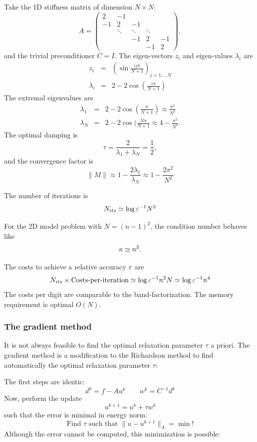 Take the 1D stiffness matrix of dimension $N \times N$:
$$
A = \left( \begin{array}{ccccc}
        2 & -1  \\
        -1 & 2 & -1 \\
        & \ddots & \ddots & \ddots \\
        & & -1 & 2 & -1 \\
        & & & -1 & 2 
        \end{array}
        \right),
$$
and the trivial preconditioner $C = I$. The eigen-vectors $z_i$ and 
eigen-values $\lambda_i$ are
\begin{eqnarray*}
z_{i} & = & \left(\sin \frac{i j \pi}{N+1} \right)_{j=1, \ldots N} \\
\lambda_i & = & 2 - 2 \cos (\frac{i \pi}{N+1})
\end{eqnarray*}
The extremal eigenvalues are
\begin{eqnarray*}
\lambda_1 & = & 2 - 2 \cos ( \frac{\pi}{N+1}) \approx \frac{\pi^2}{N^2} \\
\lambda_N & = & 2 - 2 \cos ( \frac{N \pi}{N+1} \approx 4 - \frac{\pi^2}{N^2}.
\end{eqnarray*}
The optimal damping is
$$
\tau = \frac{2}{\lambda_1+\lambda_N} = \frac{1}{2},
$$
and the convergence factor is
$$
\| M \| \approx 1 - \frac{2 \lambda_1}{\lambda_N} \approx 1 - \frac{2 \pi^2}{N^2}
$$

The number of iterations is
$$
N_{its} \simeq \log \varepsilon^{-1} N^2
$$

\bigskip

For the 2D model problem with $N = (n-1)^2$, the condition number behaves like
$$
\kappa \simeq n^2.
$$

The costs to achieve a relative accuracy $\varepsilon$ are
$$
N_{its} \times \mbox{Costs-per-iteration} 
\simeq \log \varepsilon^{-1} n^2 N \simeq \log \varepsilon^{-1} n^4
$$
The costs per digit are comparable to the band-factorization. The memory 
requirement is optimal $O(N)$.

\subsubsection{The gradient method}

It is not always feasible to find the optimal relaxation parameter $\tau$
a priori. The gradient method is a modification to the Richardson method
to find automatically the optimal relaxation parameter $\tau$:

The first steps are identic:
$$
d^k = f - A u^k \qquad w^k = C^{-1} d^k
$$
Now, perform the update
$$
u^{k+1} = u^k + \tau w^k
$$
such that the error is minimal in energy norm:
$$
\mbox{Find } \tau \mbox{ such that } \| u - u^{k+1} \|_A = \min !
$$
Although the error cannot be computed, this minimization is possible:

